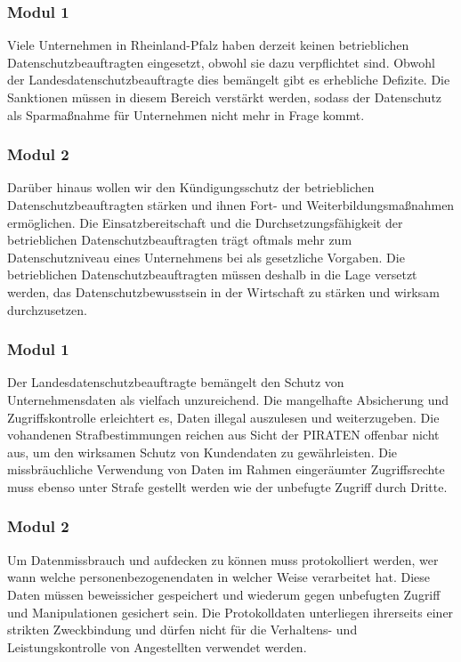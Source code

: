 \label{datenschutz:beauftragte}
\subsubsection{Modul 1}
\abstimmung
Viele Unternehmen in Rheinland-Pfalz haben derzeit keinen betrieblichen Datenschutzbeauftragten eingesetzt, obwohl sie dazu verpflichtet sind. Obwohl der Landesdatenschutzbeauftragte dies bemängelt gibt es erhebliche Defizite. Die Sanktionen müssen in diesem Bereich verstärkt werden, sodass der Datenschutz als Sparmaßnahme für Unternehmen nicht mehr in Frage kommt.

\subsubsection{Modul 2}
\abstimmung
Darüber hinaus wollen wir den Kündigungsschutz der betrieblichen Datenschutzbeauftragten stärken und ihnen Fort- und Weiterbildungsmaßnahmen ermöglichen. Die Einsatzbereitschaft und die Durchsetzungsfähigkeit der betrieblichen Datenschutzbeauftragten trägt oftmals mehr zum Datenschutzniveau eines Unternehmens bei als gesetzliche Vorgaben. Die betrieblichen Datenschutzbeauftragten müssen deshalb in die Lage versetzt werden, das Datenschutzbewusstsein in der Wirtschaft zu stärken und wirksam durchzusetzen.
 
\label{datenschutz:dbs}
\subsubsection{Modul 1}
\abstimmung
Der Landesdatenschutzbeauftragte bemängelt den Schutz von Unternehmensdaten als vielfach unzureichend. Die mangelhafte Absicherung und Zugriffskontrolle erleichtert es, Daten illegal auszulesen und weiterzugeben. Die vohandenen Strafbestimmungen reichen aus Sicht der PIRATEN offenbar nicht aus, um den wirksamen Schutz von Kundendaten zu gewährleisten. Die missbräuchliche Verwendung von Daten im Rahmen eingeräumter Zugriffsrechte muss ebenso unter Strafe gestellt werden wie der unbefugte Zugriff durch Dritte.

\subsubsection{Modul 2}
\abstimmung
Um Datenmissbrauch und aufdecken zu können muss protokolliert werden, wer wann welche personenbezogenendaten in welcher Weise verarbeitet hat. Diese Daten müssen beweissicher gespeichert und wiederum gegen unbefugten Zugriff und Manipulationen gesichert sein. Die Protokolldaten unterliegen ihrerseits einer strikten Zweckbindung und dürfen nicht für die Verhaltens- und Leistungskontrolle von Angestellten verwendet werden.
 
